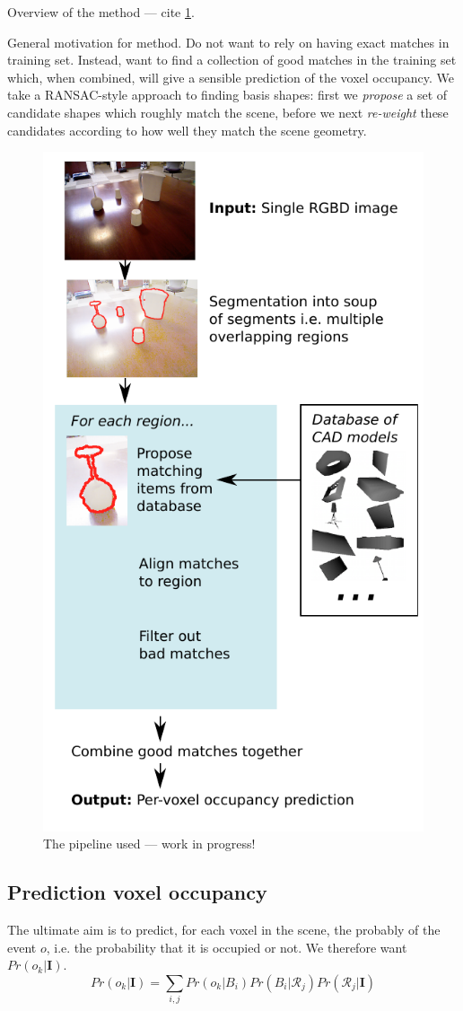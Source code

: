 \documentclass[10pt,a4paper]{article}
\makeatletter
\newcommand*{\ie}{i.e.\@\xspace}
\newcommand{\prob}{Pr}
\newcommand{\rgbdimage}{\mathbf{I}}
\newcommand{\imregion}{\mathcal{R}}
\newcommand{\occ}{o}
\newcommand{\basisshape}{B}
\makeatother
\begin{document}
Overview of the method --- cite \ref{fig:pipeline}.

General motivation for method. Do not want to rely on having exact matches in training set. 
Instead, want to find a collection of good matches in the training set which, when combined, will give a sensible prediction of the voxel occupancy.
We take a RANSAC-style approach to finding basis shapes: first we \emph{propose} a set of candidate shapes which roughly match the scene, before we next \emph{re-weight} these candidates according to how well they match the scene geometry. 

\begin{figure}
	\centering 
	\includegraphics[width=0.6\columnwidth]{pipeline}
	\caption{The pipeline used --- work in progress!}
	\label{fig:pipeline}
\end{figure}

\subsection{Prediction voxel occupancy}
The ultimate aim is to predict, for each voxel in the scene, the probably of the event $\occ$, \ie the probability that it is occupied or not. We therefore want $\prob(\occ_k | \rgbdimage)$.
$$
\prob(\occ_k | \rgbdimage) = \sum_{i,j} \prob(\occ_k|\basisshape_i)\prob(\basisshape_i|\imregion_j)\prob(\imregion_j|\rgbdimage)
$$
\end{document}
